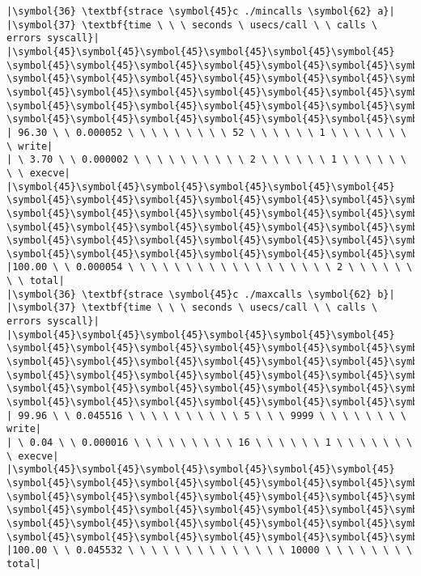 \documentclass[10pt,a4paper]{article}
\begin{document}
\begin{lstlisting}
|\symbol{36} \textbf{strace \symbol{45}c ./mincalls \symbol{62} a}|
|\symbol{37} \textbf{time \ \ \ seconds \ usecs/call \ \ calls \ errors syscall}|
|\symbol{45}\symbol{45}\symbol{45}\symbol{45}\symbol{45}\symbol{45} \symbol{45}\symbol{45}\symbol{45}\symbol{45}\symbol{45}\symbol{45}\symbol{45}\symbol{45}\symbol{45}\symbol{45} \symbol{45}\symbol{45}\symbol{45}\symbol{45}\symbol{45}\symbol{45}\symbol{45}\symbol{45}\symbol{45}\symbol{45}\symbol{45} \symbol{45}\symbol{45}\symbol{45}\symbol{45}\symbol{45}\symbol{45}\symbol{45} \symbol{45}\symbol{45}\symbol{45}\symbol{45}\symbol{45}\symbol{45}\symbol{45} \symbol{45}\symbol{45}\symbol{45}\symbol{45}\symbol{45}\symbol{45}\symbol{45}|
| 96.30 \ \ 0.000052 \ \ \ \ \ \ \ \ \ 52 \ \ \ \ \ \ 1 \ \ \ \ \ \ \ \ write|
| \ 3.70 \ \ 0.000002 \ \ \ \ \ \ \ \ \ \ 2 \ \ \ \ \ \ 1 \ \ \ \ \ \ \ \ execve|
|\symbol{45}\symbol{45}\symbol{45}\symbol{45}\symbol{45}\symbol{45} \symbol{45}\symbol{45}\symbol{45}\symbol{45}\symbol{45}\symbol{45}\symbol{45}\symbol{45}\symbol{45}\symbol{45} \symbol{45}\symbol{45}\symbol{45}\symbol{45}\symbol{45}\symbol{45}\symbol{45}\symbol{45}\symbol{45}\symbol{45}\symbol{45} \symbol{45}\symbol{45}\symbol{45}\symbol{45}\symbol{45}\symbol{45}\symbol{45} \symbol{45}\symbol{45}\symbol{45}\symbol{45}\symbol{45}\symbol{45}\symbol{45} \symbol{45}\symbol{45}\symbol{45}\symbol{45}\symbol{45}\symbol{45}\symbol{45}|
|100.00 \ \ 0.000054 \ \ \ \ \ \ \ \ \ \ \ \ \ \ \ \ \ \ 2 \ \ \ \ \ \ \ \ total|
|\symbol{36} \textbf{strace \symbol{45}c ./maxcalls \symbol{62} b}|
|\symbol{37} \textbf{time \ \ \ seconds \ usecs/call \ \ calls \ errors syscall}|
|\symbol{45}\symbol{45}\symbol{45}\symbol{45}\symbol{45}\symbol{45} \symbol{45}\symbol{45}\symbol{45}\symbol{45}\symbol{45}\symbol{45}\symbol{45}\symbol{45}\symbol{45}\symbol{45} \symbol{45}\symbol{45}\symbol{45}\symbol{45}\symbol{45}\symbol{45}\symbol{45}\symbol{45}\symbol{45}\symbol{45}\symbol{45} \symbol{45}\symbol{45}\symbol{45}\symbol{45}\symbol{45}\symbol{45}\symbol{45} \symbol{45}\symbol{45}\symbol{45}\symbol{45}\symbol{45}\symbol{45}\symbol{45} \symbol{45}\symbol{45}\symbol{45}\symbol{45}\symbol{45}\symbol{45}\symbol{45}|
| 99.96 \ \ 0.045516 \ \ \ \ \ \ \ \ \ \ 5 \ \ \ 9999 \ \ \ \ \ \ \ \ write|
| \ 0.04 \ \ 0.000016 \ \ \ \ \ \ \ \ \ 16 \ \ \ \ \ \ 1 \ \ \ \ \ \ \ \ execve|
|\symbol{45}\symbol{45}\symbol{45}\symbol{45}\symbol{45}\symbol{45} \symbol{45}\symbol{45}\symbol{45}\symbol{45}\symbol{45}\symbol{45}\symbol{45}\symbol{45}\symbol{45}\symbol{45} \symbol{45}\symbol{45}\symbol{45}\symbol{45}\symbol{45}\symbol{45}\symbol{45}\symbol{45}\symbol{45}\symbol{45}\symbol{45} \symbol{45}\symbol{45}\symbol{45}\symbol{45}\symbol{45}\symbol{45}\symbol{45} \symbol{45}\symbol{45}\symbol{45}\symbol{45}\symbol{45}\symbol{45}\symbol{45} \symbol{45}\symbol{45}\symbol{45}\symbol{45}\symbol{45}\symbol{45}\symbol{45}|
|100.00 \ \ 0.045532 \ \ \ \ \ \ \ \ \ \ \ \ \ \ 10000 \ \ \ \ \ \ \ \ total|
\end{lstlisting}
\end{document}

